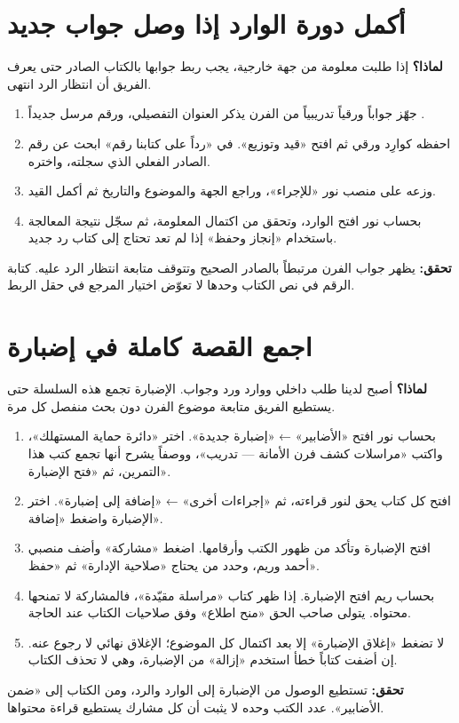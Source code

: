 \section{أكمل دورة الوارد إذا وصل جواب جديد}
\label{sec:incoming-reply}
\textbf{لماذا؟} إذا طلبت معلومة من جهة خارجية، يجب ربط جوابها بالكتاب الصادر حتى يعرف الفريق أن انتظار الرد انتهى.
\begin{enumerate}
\item جهّز جواباً ورقياً تدريبياً من الفرن يذكر العنوان التفصيلي، ورقم مرسل جديداً .
\item احفظه كوارِد ورقي ثم افتح «قيد وتوزيع». في «رداً على كتابنا رقم» ابحث عن رقم الصادر الفعلي الذي سجلته، واختره.
\item وزعه على منصب نور «للإجراء»، وراجع الجهة والموضوع والتاريخ ثم أكمل القيد.
\item بحساب نور افتح الوارد، وتحقق من اكتمال المعلومة، ثم سجّل نتيجة المعالجة باستخدام «إنجاز وحفظ» إذا لم تعد تحتاج إلى كتاب رد جديد.
\end{enumerate}
\textbf{تحقق:} يظهر جواب الفرن مرتبطاً بالصادر الصحيح وتتوقف متابعة انتظار الرد عليه. كتابة الرقم في نص الكتاب وحدها لا تعوّض اختيار المرجع في حقل الربط.

\section{اجمع القصة كاملة في إضبارة}
\label{sec:dossier}
\textbf{لماذا؟} أصبح لدينا طلب داخلي ووارد ورد وجواب. الإضبارة تجمع هذه السلسلة حتى يستطيع الفريق متابعة موضوع الفرن دون بحث منفصل كل مرة.
\begin{enumerate}
\item بحساب نور افتح «الأضابير» ← «إضبارة جديدة». اختر «دائرة حماية المستهلك»، واكتب «مراسلات كشف فرن الأمانة — تدريب»، ووصفاً يشرح أنها تجمع كتب هذا التمرين، ثم «فتح الإضبارة».
\item افتح كل كتاب يحق لنور قراءته، ثم «إجراءات أخرى» ← «إضافة إلى إضبارة». اختر الإضبارة واضغط «إضافة».
\item افتح الإضبارة وتأكد من ظهور الكتب وأرقامها. اضغط «مشاركة» وأضف منصبي أحمد وريم، وحدد من يحتاج «صلاحية الإدارة» ثم «حفظ».
\item بحساب ريم افتح الإضبارة. إذا ظهر كتاب «مراسلة مقيّدة»، فالمشاركة لا تمنحها محتواه. يتولى صاحب الحق «منح اطلاع» وفق صلاحيات الكتاب عند الحاجة.
\item لا تضغط «إغلاق الإضبارة» إلا بعد اكتمال كل الموضوع؛ الإغلاق نهائي لا رجوع عنه. إن أضفت كتاباً خطأ استخدم «إزالة» من الإضبارة، وهي لا تحذف الكتاب.
\end{enumerate}
\textbf{تحقق:} تستطيع الوصول من الإضبارة إلى الوارد والرد، ومن الكتاب إلى «ضمن الأضابير». عدد الكتب وحده لا يثبت أن كل مشارك يستطيع قراءة محتواها.

